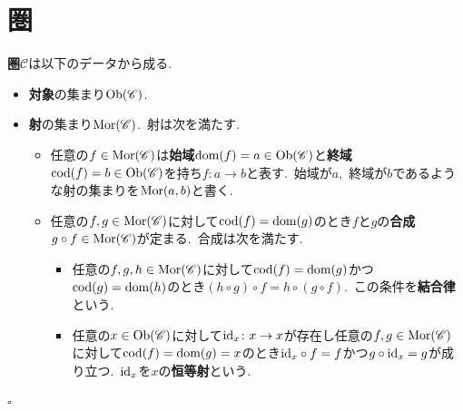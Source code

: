 \section{圏}
\begin{definition}
\textbf{圏}$\mathscr{C}$は以下のデータから成る.
\begin{itemize}
    \item \textbf{対象}の集まり$\textrm{Ob}(\mathscr{C})$.
    \item \textbf{射}の集まり$\textrm{Mor}(\mathscr{C})$.\ 射は次を満たす.
    \begin{itemize}
    \item 任意の$f \in \textrm{Mor}(\mathscr{C})$は\textbf{始域}$\textrm{dom}(f) = a \in \textrm{Ob}(\mathscr{C})$と\textbf{終域}$\textrm{cod}(f) = b \in \textrm{Ob}(\mathscr{C})$を持ち$f \colon a \to b$と表す.\ 始域が$a$,\ 終域が$b$であるような射の集まりを$\textrm{Mor}(a,b)$と書く.
    \item 任意の$f, g \in \textrm{Mor}(\mathscr{C})$に対して$\textrm{cod}(f) = \textrm{dom}(g)$のとき$f$と$g$の\textbf{合成}$g \circ f \in \textrm{Mor}(\mathscr{C})$が定まる.\ 合成は次を満たす.
        \begin{itemize}
        \item 任意の$f,g,h \in \textrm{Mor}(\mathscr{C})$に対して$\textrm{cod}(f) = \textrm{dom}(g)$かつ$\textrm{cod}(g) = \textrm{dom}(h)$のとき$(h \circ g) \circ f = h \circ (g \circ f)$.\ この条件を\textbf{結合律}という.
        \item 任意の$x \in \textrm{Ob}(\mathscr{C})$に対して$\textrm{id}_x \colon x \to x$が存在し任意の$f,g \in \textrm{Mor}(\mathscr{C})$に対して$\textrm{cod}(f) = \textrm{dom}(g) = x$のとき$\textrm{id}_x \circ f = f$かつ$g \circ \textrm{id}_x = g$が成り立つ.\ $\textrm{id}_x$を$x$の\textbf{恒等射}という.
        \end{itemize}
    \end{itemize}
\end{itemize}
\hfill $\square$
\end{definition}